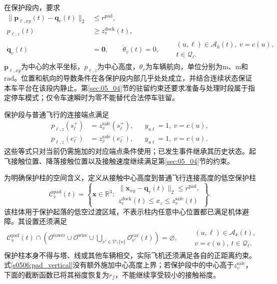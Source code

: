 在保护段内，要求
\begin{align}
 \|\mathbf p_{\ell,xy}(t)-\mathbf q_v(t)\|_2
 &\le r^{\mathrm{pad}},
 \label{s0506:pad_horizontal}\\
 p_{\ell,z}(t)&\ge z_v^{\mathrm{dock}}(t),
 \label{s0506:pad_vertical}\\
 \dot{\mathbf q}_v(t)&=\mathbf0,\qquad
 \dot\theta_v(t)=0,
 \qquad
 \substack{(u,\ell)\in\mathcal A_k(t),\ v=c(u),\\t\in\mathcal Q_\ell.}
 \label{s0506:stationary_carrier}
\end{align}
$\mathbf p_{\ell,xy}$为中心的水平坐标，$p_{\ell,z}$为中心高度，$\theta_v$为车辆航向，单位分别为$\mathrm m$、$\mathrm m$和$\mathrm{rad}$。位置和航向的导数条件在各保护段内部几乎处处成立，并结合连续状态保证本车平台在该段内静止。第\ref{sec:05_04}节的驻留约束还要求准备与处理时段属于指定停车模式；仅令车速瞬时为零不能替代合法停车驻留。

保护段与普通飞行的连接端点满足
\begin{align}
 p_{\ell,z}(s_\ell^+)&=z_v^{\mathrm{safe}}(s_\ell^+),
 &&y_{u\ell}=1,\ v=c(u),
 \label{s0506:launch_safe_endpoint}\\
 p_{\ell,z}(e_\ell^-)&=z_v^{\mathrm{safe}}(e_\ell^-),
 &&y_{u\ell}=1,\ v=c(u).
 \label{s0506:recovery_safe_endpoint}
\end{align}
这些等式只对当前仍需施加的对应端点条件使用；已发生事件继承其历史状态。起飞接触位置、降落接触位置以及接触速度继续满足第\ref{sec:05_04}节的约束。

为明确保护柱的空间含义，定义从接触中心高度到普通飞行连接高度的低空保护柱
\begin{equation}
 \mathcal C_v^{\mathrm{pad}}(t)=
 \left\{\mathbf x\in\mathbb R^3:
 \begin{array}{l}
 \|\mathbf x_{xy}-\mathbf q_v(t)\|_2\le r^{\mathrm{pad}},\\
 z_v^{\mathrm{dock}}(t)\le x_z\le z_v^{\mathrm{safe}}(t)
 \end{array}\right\}.
 \label{s0506:pad_column}
\end{equation}
该柱体用于保护起落的低空过渡区域，不表示柱内任意中心位置都已满足机体避障。其设置还须满足
\begin{equation}
 \begin{aligned}
 \mathcal C_v^{\mathrm{pad}}(t)\cap
 \left(\mathcal O^{\mathrm{tower}}\cup\mathcal O^{\mathrm{wire}}
 \cup\bigcup_{v'\in\mathcal V\setminus\{v\}}
             \mathcal O_{v'}^{\mathrm{car}}(t)\right)
 =\varnothing,\qquad
 \substack{(u,\ell)\in\mathcal A_k(t),\\v=c(u),\ t\in\mathcal Q_\ell.}
 \end{aligned}
 \label{s0506:pad_column_exclusion}
\end{equation}
保护柱本身不得与塔、线或其他车辆相交，实际飞机还须满足各自的正距离约束。式\eqref{s0506:pad_vertical}没有额外施加中心高度上界；若保护段中的中心高于$z_v^{\mathrm{safe}}$，下面的截断函数已将其裕度恢复为$r_f$，不能继续享受较小的接触裕度。

